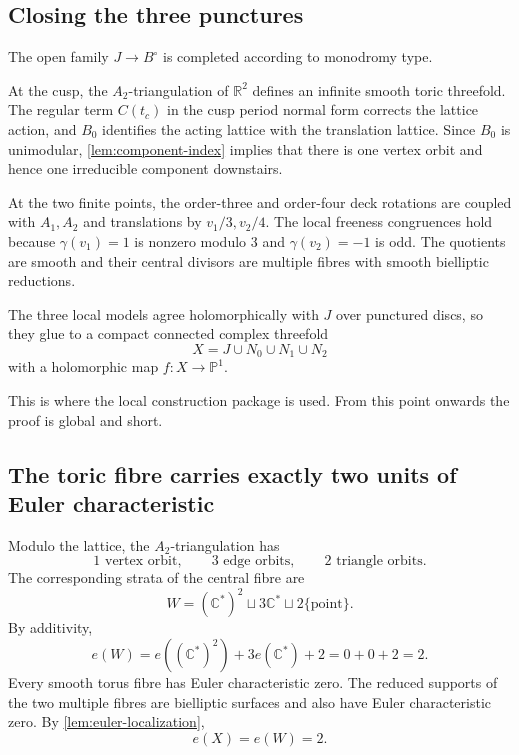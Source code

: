 \documentclass[11pt,reqno]{amsart}
\numberwithin{equation}{section}
\newcommand{\R}{\mathbb R}
\newcommand{\C}{\mathbb C}
\newcommand{\Pone}{\mathbb P^1}
\theoremstyle{definition}
\begin{document}
\subsection{Closing the three punctures}

The open family $J\to B^\circ$ is completed according to monodromy type.

At the cusp, the $A_2$-triangulation of $\R^2$ defines an infinite smooth toric threefold. The regular term $C(t_c)$ in the cusp period normal form corrects the lattice action, and $B_0$ identifies the acting lattice with the translation lattice. Since $B_0$ is unimodular, \cref{lem:component-index} implies that there is one vertex orbit and hence one irreducible component downstairs.

At the two finite points, the order-three and order-four deck rotations are coupled with $A_1,A_2$ and translations by $v_1/3,v_2/4$. The local freeness congruences hold because $\gamma(v_1)=1$ is nonzero modulo $3$ and $\gamma(v_2)=-1$ is odd. The quotients are smooth and their central divisors are multiple fibres with smooth bielliptic reductions.

The three local models agree holomorphically with $J$ over punctured discs, so they glue to a compact connected complex threefold
\[
X=J\cup N_0\cup N_1\cup N_2
\]
with a holomorphic map $f:X\to\Pone$.

This is where the local construction package is used. From this point onwards the proof is global and short.

\subsection{The toric fibre carries exactly two units of Euler characteristic}

Modulo the lattice, the $A_2$-triangulation has
\[
1\text{ vertex orbit},
\qquad
3\text{ edge orbits},
\qquad
2\text{ triangle orbits}.
\]
The corresponding strata of the central fibre are
\[
W=(\C^*)^2\sqcup 3\C^*\sqcup 2\{\mathrm{point}\}.
\]
By additivity,
\begin{equation}\label{eq:eW}
e(W)=e((\C^*)^2)+3e(\C^*)+2=0+0+2=2.
\end{equation}
Every smooth torus fibre has Euler characteristic zero. The reduced supports of the two multiple fibres are bielliptic surfaces and also have Euler characteristic zero. By \cref{lem:euler-localization},
\begin{equation}\label{eq:eX}
e(X)=e(W)=2.
\end{equation}
\end{document}
